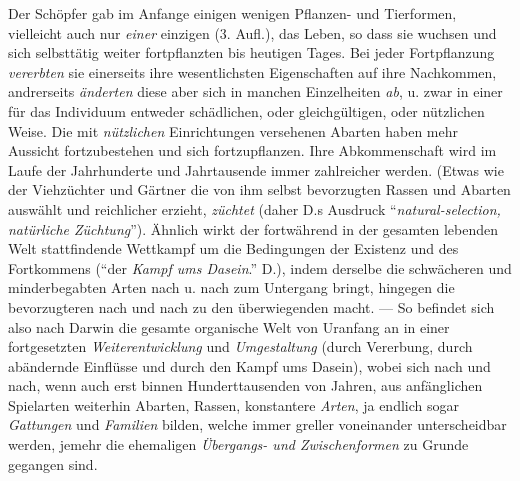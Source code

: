 \documentclass[a4paper, 11pt, oneside, english]{article}
\begin{document}
Der Schöpfer gab im Anfange einigen wenigen Pflanzen- und Tierformen, vielleicht auch nur \emph{einer} einzigen (3. Aufl.), das Leben, so dass sie wuchsen und sich selbsttätig weiter fortpflanzten bis heutigen Tages. Bei jeder Fortpflanzung \emph{vererbten} sie einerseits ihre wesentlichsten Eigenschaften auf ihre Nachkommen, andrerseits \emph{änderten} diese aber sich in manchen Einzelheiten \emph{ab}, u. zwar in einer für das Individuum entweder schädlichen, oder gleichgültigen, oder nützlichen Weise. Die mit \emph{nützlichen} Einrichtungen versehenen Abarten haben mehr Aussicht fortzubestehen und sich fortzupflanzen. Ihre Abkommenschaft wird im Laufe der Jahrhunderte und Jahrtausende immer zahlreicher werden. (Etwas wie der Viehzüchter und Gärtner die von ihm selbst bevorzugten Rassen und Abarten auswählt und reichlicher erzieht, \emph{züchtet} (daher D.s Ausdruck "`\emph{natural-selection, natürliche Züchtung}"'). Ähnlich wirkt der fortwährend in der gesamten lebenden Welt stattfindende Wettkampf um die Bedingungen der Existenz und des Fortkommens ("`der \emph{Kampf ums Dasein}."' D.), indem derselbe die schwächeren und minderbegabten Arten nach u. nach zum Untergang bringt, hingegen die bevorzugteren nach und nach zu den überwiegenden macht. --- So befindet sich also nach Darwin die gesamte organische Welt von Uranfang an in einer fortgesetzten \emph{Weiterentwicklung} und \emph{Umgestaltung} (durch Vererbung, durch abändernde Einflüsse und durch den Kampf ums Dasein), wobei sich nach und nach, wenn auch erst binnen Hunderttausenden von Jahren, aus anfänglichen Spielarten weiterhin Abarten, Rassen, konstantere \emph{Arten}, ja endlich sogar \emph{Gattungen} und \emph{Familien} bilden, welche immer greller voneinander unterscheidbar werden, jemehr die ehemaligen \emph{Übergangs- und Zwischenformen} zu Grunde gegangen sind.
\end{document}
